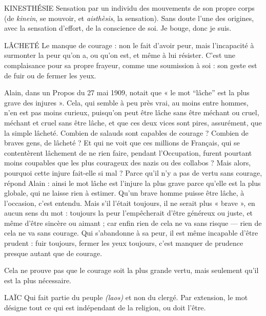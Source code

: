 {KINESTHÉSIE Sensation par un individu des mouvements de son propre
corps (de {\it kinein}, se mouvoir, et {\it aisthèsis}, la sensation). Sans
doute l’une des origines, avec la sensation d’effort, de la conscience de soi. Je
bouge, donc je suis.

LÂCHETÉ Le manque de courage : non le fait d’avoir peur, mais l’incapacité
à surmonter la peur qu’on a, ou qu’on est, et même à lui
résister. C’est une complaisance pour sa propre frayeur, comme une soumission
à soi : son geste est de fuir ou de fermer les yeux.

Alain, dans un Propos du 27 mai 1909, notait que « le mot “lâche” est la plus
grave des injures ». Cela, qui semble à peu près vrai, au moins entre hommes, n’en
est pas moins curieux, puisqu'on peut être lâche sans être méchant ou cruel,
méchant et cruel sans être lâche, et que ces deux vices sont pires, assurément, que la
simple lâcheté. Combien de salauds sont capables de courage ? Combien de braves
gens, de lâcheté ? Et qui ne voit que ces millions de Français, qui se contentèrent
lâchement de ne rien faire, pendant l'Occupation, furent pourtant moins coupables
que les plus courageux des nazis ou des collabos ? Mais alors, pourquoi cette injure
fait-elle si mal ? Parce qu'il n’y a pas de vertu sans courage, répond Alain : ainsi le
mot lâche est l'injure la plus grave parce qu’elle est la plus globale, qui ne laisse rien
à estimer. Qu'un brave homme puisse être lâche, à l’occasion, c’est entendu. Mais
s’il l'était toujours, il ne serait plus « brave », en aucun sens du mot : toujours la
peur l'empêcherait d’être généreux ou juste, et même d’être sincère ou aimant ; car
enfin rien de cela ne va sans risque — rien de cela ne va sans courage. Qui s’abandonne
à sa peur, il est même incapable d’être prudent : fuir toujours, fermer les
yeux toujours, c'est manquer de prudence presque autant que de courage.

Cela ne prouve pas que le courage soit la plus grande vertu, mais seulement
qu’il est la plus nécessaire.

LAÏC Qui fait partie du peuple {\it (laos)} et non du clergé. Par extension, le mot
désigne tout ce qui est indépendant de la religion, ou doit l'être.

}
